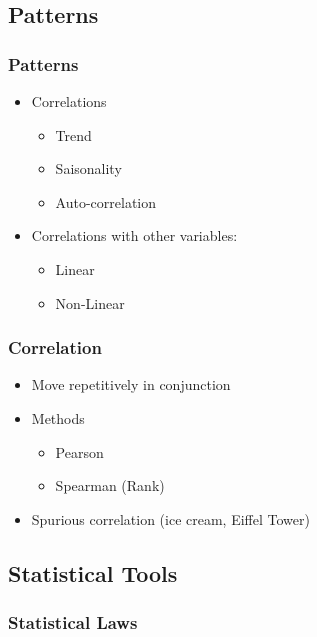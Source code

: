 \subsection{Patterns}

\begin{frame}\frametitle{Patterns}
   \begin{itemize}
      \item Correlations
      \begin{itemize}
         \item Trend
         \item Saisonality
         \item Auto-correlation
      \end{itemize}
      \item Correlations with other variables:
      \begin{itemize}
         \item Linear
         \item Non-Linear
      \end{itemize}
   \end{itemize}
\end{frame}

\begin{frame}\frametitle{Correlation}
   \begin{itemize}
      \item Move repetitively in conjunction
      \item Methods
      \begin{itemize}
         \item Pearson
         \item Spearman (Rank)
      \end{itemize}
      \item Spurious correlation (ice cream, Eiffel Tower)
   \end{itemize}
\end{frame}


\subsection{Statistical Tools}

\subsubsection{Statistical Laws}

